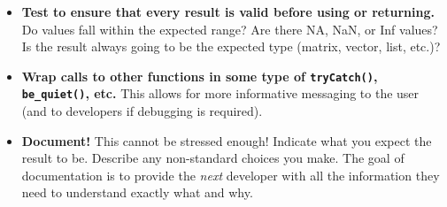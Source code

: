 \documentclass[
]{book}
\providecommand{\tightlist}{%
  \setlength{\itemsep}{0pt}\setlength{\parskip}{0pt}}
\begin{document}
\begin{itemize}
\tightlist
\item
  \textbf{Test to ensure that every result is valid before using or returning.} Do values fall within the expected range? Are there NA, NaN, or Inf values? Is the result always going to be the expected type (matrix, vector, list, etc.)?\\
\item
  \textbf{Wrap calls to other functions in some type of \texttt{tryCatch()}, \texttt{be\_quiet()}, etc.} This allows for more informative messaging to the user (and to developers if debugging is required).
\item
  \textbf{Document!} This cannot be stressed enough! Indicate what you expect the result to be. Describe any non-standard choices you make. The goal of documentation is to provide the \emph{next} developer with all the information they need to understand exactly what and why.
\end{itemize}
\end{document}
